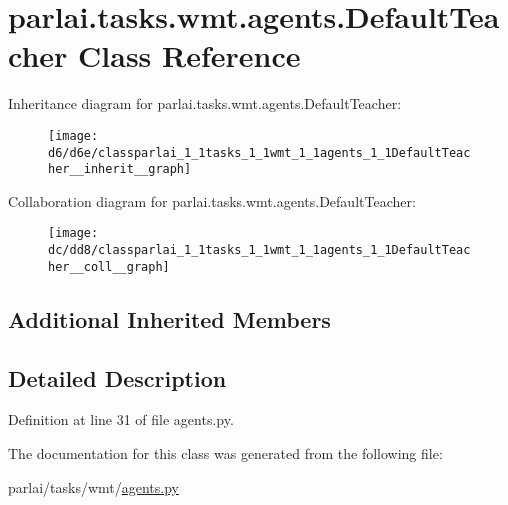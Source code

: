 \hypertarget{classparlai_1_1tasks_1_1wmt_1_1agents_1_1DefaultTeacher}{}\section{parlai.\+tasks.\+wmt.\+agents.\+Default\+Teacher Class Reference}
\label{classparlai_1_1tasks_1_1wmt_1_1agents_1_1DefaultTeacher}


Inheritance diagram for parlai.\+tasks.\+wmt.\+agents.\+Default\+Teacher\+:
\nopagebreak
\begin{figure}[H]
\begin{center}
\leavevmode
\texttt{[image: d6/d6e/classparlai\_1\_1tasks\_1\_1wmt\_1\_1agents\_1\_1DefaultTeacher\_\_inherit\_\_graph]}
\end{center}
\end{figure}


Collaboration diagram for parlai.\+tasks.\+wmt.\+agents.\+Default\+Teacher\+:
\nopagebreak
\begin{figure}[H]
\begin{center}
\leavevmode
\texttt{[image: dc/dd8/classparlai\_1\_1tasks\_1\_1wmt\_1\_1agents\_1\_1DefaultTeacher\_\_coll\_\_graph]}
\end{center}
\end{figure}
\subsection*{Additional Inherited Members}


\subsection{Detailed Description}


Definition at line 31 of file agents.\+py.



The documentation for this class was generated from the following file\+:\begin{DoxyCompactItemize}
\item 
parlai/tasks/wmt/\hyperlink{parlai_2tasks_2wmt_2agents_8py}{agents.\+py}\end{DoxyCompactItemize}
